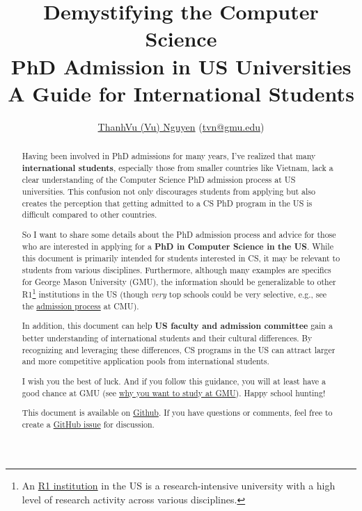 \documentclass[11pt]{article}
\title{\vspace{-1in} Demystifying the Computer Science \\PhD Admission in US Universities\\{\large A Guide for International Students}}
\author{\small \href{https://nguyenthanhvuh.github.io}{ThanhVu (Vu) Nguyen} (\href{mailto:tvn@gmu.edu}{tvn@gmu.edu})}
\begin{document}
\maketitle

\begin{abstract}
Having been involved in PhD admissions for many years, I've
realized that many \textbf{international students}, especially those from smaller countries like Vietnam, lack a clear understanding of
the Computer Science PhD admission process at US universities. This confusion not only
discourages students from applying but also creates the perception that
getting admitted to a CS PhD program in the US is difficult compared to other countries.

So I want to share some details about the PhD admission process and advice for those who are interested in applying for a \textbf{PhD in Computer Science in the US}.
While this document is primarily intended for students interested in CS, it may be relevant to students from various disciplines.
Furthermore, although many examples are specifics for George Mason University (GMU), the information should be generalizable to other R1\footnote{An \href{https://en.wikipedia.org/wiki/List_of_research_universities_in_the_United_States}{R1 institution} in the US is a research-intensive university with a high level of research activity across various disciplines.} institutions in the US  (though \emph{very} top schools could be very selective, e.g., see the \href{https://da-data.blogspot.com/2015/03/reflecting-on-cs-graduate-admissions.html}{admission process} at CMU).

In addition, this document can help \textbf{US faculty and admission committee} gain a better understanding of international students and their cultural differences.  By recognizing and leveraging these differences, CS programs in the US can attract larger and more competitive application pools from international students.

I wish you the best of luck. And if you follow this guidance, you will at least have a good chance at GMU (see
\href{https://github.com/dynaroars/dynaroars.github.io/wiki/About-GMU}{why
you want to study at GMU}). Happy school hunting!

This document is available on \href{https://github.com/nguyenthanhvuh/phd-cs-us}{Github}. If you have questions or comments, feel free to create a \href{https://github.com/nguyenthanhvuh/phd-cs-us/issues}{GitHub issue} for discussion.
\end{abstract}
\end{document}

